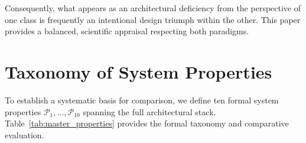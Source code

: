 \documentclass[10pt,journal,compsoc,twocolumn]{article}
\begin{document}
Consequently, what appears as an architectural deficiency from the perspective of one class is frequently an intentional design triumph within the other. This paper provides a balanced, scientific appraisal respecting both paradigms.

\section{Taxonomy of System Properties}
\label{sec:properties}

To establish a systematic basis for comparison, we define ten formal system properties $\mathcal{P}_1, \dots, \mathcal{P}_{10}$ spanning the full architectural stack. Table~\ref{tab:master_properties} provides the formal taxonomy and comparative evaluation.
\end{document}
